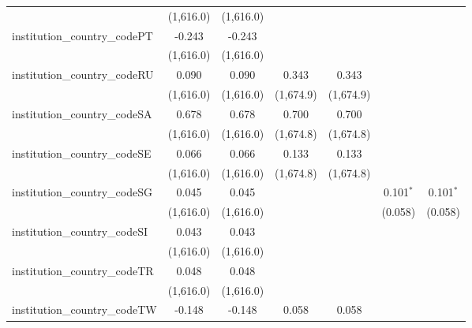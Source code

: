 \begin{tabular}{lcccccc}
                                         & (1,616.0)      & (1,616.0)      &               &               &              &   \\   
   institution\_country\_codePT          & -0.243         & -0.243         &               &               &              &   \\   
                                         & (1,616.0)      & (1,616.0)      &               &               &              &   \\   
   institution\_country\_codeRU          & 0.090          & 0.090          & 0.343         & 0.343         &              &   \\   
                                         & (1,616.0)      & (1,616.0)      & (1,674.9)     & (1,674.9)     &              &   \\   
   institution\_country\_codeSA          & 0.678          & 0.678          & 0.700         & 0.700         &              &   \\   
                                         & (1,616.0)      & (1,616.0)      & (1,674.8)     & (1,674.8)     &              &   \\   
   institution\_country\_codeSE          & 0.066          & 0.066          & 0.133         & 0.133         &              &   \\   
                                         & (1,616.0)      & (1,616.0)      & (1,674.8)     & (1,674.8)     &              &   \\   
   institution\_country\_codeSG          & 0.045          & 0.045          &               &               & 0.101$^{*}$  & 0.101$^{*}$\\   
                                         & (1,616.0)      & (1,616.0)      &               &               & (0.058)      & (0.058)\\   
   institution\_country\_codeSI          & 0.043          & 0.043          &               &               &              &   \\   
                                         & (1,616.0)      & (1,616.0)      &               &               &              &   \\   
   institution\_country\_codeTR          & 0.048          & 0.048          &               &               &              &   \\   
                                         & (1,616.0)      & (1,616.0)      &               &               &              &   \\   
   institution\_country\_codeTW          & -0.148         & -0.148         & 0.058         & 0.058         &              &   \\   

\end{tabular}
